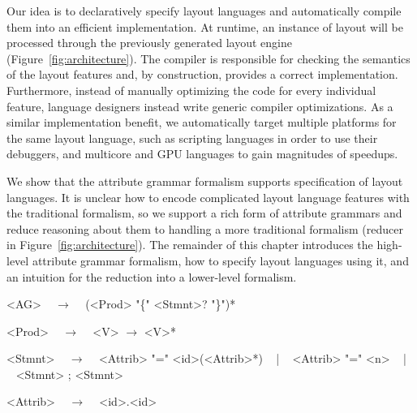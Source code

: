 Our idea is to declaratively specify layout languages and automatically compile them into an efficient implementation. At runtime, an instance of layout will be processed through the previously generated layout engine (Figure~\ref{fig:architecture}). The compiler is responsible for checking the semantics of the layout features and, by construction, provides a correct implementation. Furthermore, instead of manually optimizing the code for every individual feature, language designers instead write generic compiler optimizations. As a similar implementation benefit, we automatically target multiple platforms for the same layout language, such as scripting languages in order to use their debuggers, and multicore and GPU languages to gain magnitudes of speedups.

We show that the attribute grammar formalism supports specification of layout languages. It is unclear how to encode complicated layout language features with the traditional formalism, so we support a rich form of attribute grammars and reduce reasoning about them to handling a more traditional formalism (reducer in Figure~\ref{fig:architecture}). The remainder of this chapter introduces the high-level attribute grammar formalism, how to specify layout languages using it, and an intuition for the reduction into a lower-level formalism.


\newsavebox{\agdef}
\begin{lrbox}{\agdef}%
\begin{minipage}{1\columnwidth}
\setlength{\grammarparsep}{0.15cm}   %
\setlength{\grammarindent}{1cm}
\renewcommand{\litleft}{\bfseries}
\renewcommand{\ulitleft}{\bfseries}
\renewcommand{\superscript}[1]{\ensuremath{^{\textrm{#1}}}}
\renewcommand{\subscript}[1]{\ensuremath{_{\textrm{\uppercase{#1}}}}}
\renewcommand{\syntleft}{\normalfont\itshape}
\renewcommand{\syntright}{}
\renewcommand{\deriv}{~ $\rightarrow$ ~}
\begin{grammar}
<AG> \deriv{} (<Prod> "\{" <Stmnt>? "\}")*

<Prod> \deriv{} <V> $\rightarrow$ <V>*

<Stmnt> \deriv{} <Attrib> "=" <id>(<Attrib>*) ~  | ~ <Attrib> "=" <n> ~ | ~ <Stmnt> ; <Stmnt> 

<Attrib> \deriv{} <id>.<id>
\end{grammar}
\end{minipage}
\end{lrbox}



